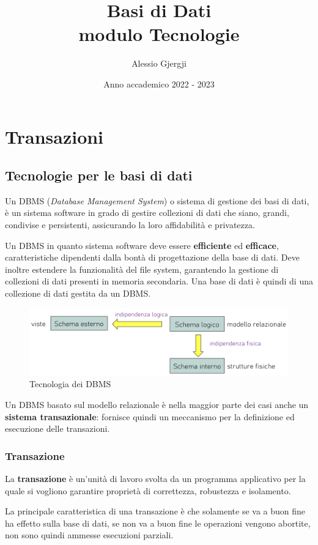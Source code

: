 \documentclass[oneside,a4paper,11pt]{book}
\title{Basi di Dati \\ \large{modulo Tecnologie}}
\author{Alessio Gjergji}
\date{Anno accademico 2022 - 2023}
\theoremstyle{italicstyle}
\theoremstyle{normStyle}
\begin{document}
\hypersetup{ %
    linktoc=all,     %
    linkcolor=black,  %
}
\maketitle
\tableofcontents
\chapter{Transazioni}
\section{Tecnologie per le basi di dati}
Un DBMS (\textit{Database Management System}) o sistema di gestione dei basi 
di dati, è un sistema software in grado di gestire collezioni di dati che 
siano, grandi, condivise e persistenti, assicurando la loro affidabilità 
e privatezza.

Un DBMS in quanto sistema software deve essere \textbf{efficiente} ed \textbf{efficace}, 
caratteristiche dipendenti dalla bontà di progettazione della base 
di dati. Deve inoltre estendere la funzionalità del file system, garantendo la 
gestione di collezioni di dati presenti in memoria secondaria.
Una base di dati è quindi di una collezione di dati gestita da un DBMS.
\begin{figure}[H]
    \centering
    \includegraphics[width=15cm]{img/architetturaDBMS.jpeg}
    \caption{Tecnologia dei DBMS}
    \label{fig:tec_DBMS}
  \end{figure}
Un DBMS basato sul modello relazionale è nella maggior parte dei casi 
anche un \textbf{sistema transazionale}: fornisce quindi un meccanismo 
per la definizione ed esecuzione delle transazioni.
\subsection{Transazione}
\begin{tcolorbox}
La \textbf{transazione} è un'unità di lavoro svolta da un programma applicativo per 
la quale si vogliono garantire proprietà di correttezza, robustezza e isolamento.
\end{tcolorbox}
La principale caratteristica di una transazione è che solamente se va a buon fine 
ha effetto sulla base di dati, se non va a buon fine le operazioni vengono 
abortite, non sono quindi ammesse esecuzioni parziali.
\end{document}
